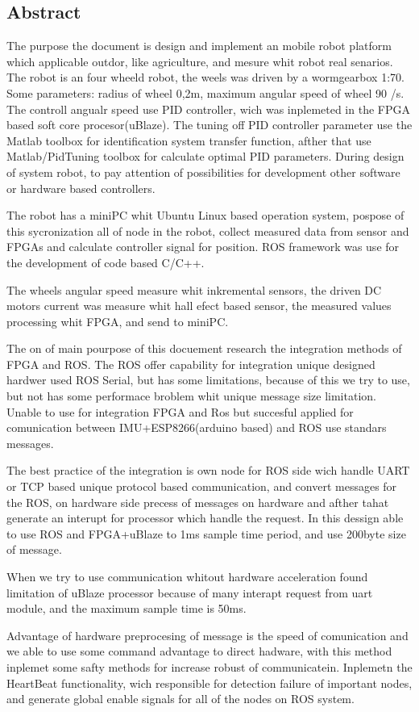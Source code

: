 \begin{titlepage}

\section*{Abstract}

The purpose the document is design and implement an mobile robot platform which applicable outdor, like agriculture, and mesure whit robot real senarios. The robot is an four wheeld robot, the weels was driven by a wormgearbox 1:70. Some parameters: radius of wheel 0,2m, maximum angular speed of wheel 90 \degree/s. The controll angualr speed use PID controller, wich was inplemeted in the FPGA based soft core procesor(uBlaze). The tuning off PID controller parameter use the Matlab toolbox for identification system transfer function, afther that use Matlab/PidTuning toolbox for calculate optimal PID parameters. During design of system robot, to pay attention of possibilities for development other software or hardware based controllers. 

The robot has a miniPC whit Ubuntu Linux based operation system, pospose of this sycronization all of node in the robot, collect measured data from sensor and FPGAs and calculate controller signal for position. ROS framework was use for the development of code based C/C++.

The wheels angular speed measure whit inkremental sensors, the driven DC motors current was measure whit hall efect based sensor, the measured values processing whit FPGA, and send to miniPC.

The on of main pourpose of this docuement research the integration methods of FPGA and ROS. The ROS offer capability for integration unique designed hardwer used ROS Serial, but has some limitations, because of this we try to use, but not has some performace broblem whit unique message size limitation. Unable to use for integration FPGA and Ros but succesful applied for comunication between IMU+ESP8266(arduino based) and ROS use standars messages.

The best practice of the integration is own node for ROS side wich handle UART or TCP based unique protocol based communication, and convert messages for the ROS, on hardware side precess of messages on hardware and afther tahat generate an interupt for processor which handle the request. In this dessign able to use ROS and FPGA+uBlaze to 1ms sample time period, and use 200byte size of message.

When we try to use communication whitout hardware acceleration found limitation of uBlaze processor because of many interapt request from uart module, and the maximum sample time is 50ms.

Advantage of hardware preprocesing of message is the speed of comunication and we able to use some command advantage to direct hadware, with this method inplemet some safty methods for increase robust of communicatein. Inplemetn the HeartBeat functionality, wich 
responsible for detection failure of important nodes, and generate global enable signals for all of the nodes on ROS system.



\end{titlepage}
